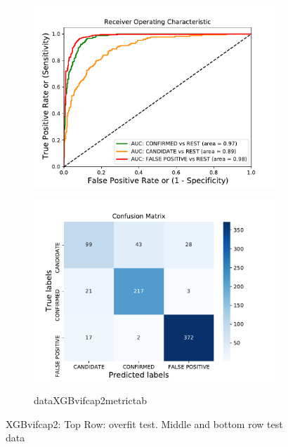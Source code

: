 \begin{figure}[H]
\begin{mdframed}[linecolor=green]
\begin{subfigure}{.49\textwidth}
                \includegraphics[width = 1\textwidth]{data/XGB_vif_cap2_roc.pdf}
                \end{subfigure}
                \begin{subfigure}{.49\textwidth}
                \includegraphics[width = 1\textwidth]{data/XGB_vif_cap2_cm.pdf}
                \end{subfigure}
                \begin{subfigure}{1\textwidth}
                \csname dataXGBvifcap2metrictab\endcsname
                \end{subfigure}
                \caption{XGBvifcap2: Top Row: overfit test. Middle and bottom row test data}
                \label{fig:data/XGB_vif_cap2_roc}
                \end{mdframed}
                \end{figure}